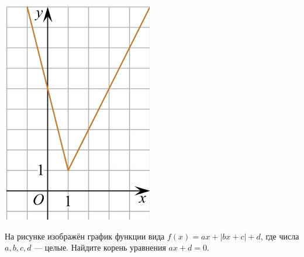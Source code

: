 \begin{class}[number=5]
\begin{listofex}
\begin{minipage}[c]{0.17\textwidth}
			\includegraphics[align=t, width=\textwidth]{pics/G101M4C5-6.jpg}
		\end{minipage}
		\item
		\begin{minipage}[t]{0.76\textwidth}
			На рисунке изображён график функции вида \(f(x)=ax+|bx+c|+d\), где числа \(a, b, c, d\) --- целые. Найдите корень уравнения \(ax+d=0\).
		\end{minipage}
		\begin{minipage}[c]{0.17\textwidth}

\end{minipage}
\end{listofex}
\end{class}
